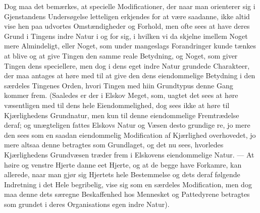 \documentclass[12pt]{book}
\def\textit#1{#1}%
\def\emph#1{#1}%
\newcommand{\opage}[1]{\marginnote{\footnotesize\textit{[#1]}}}
\begin{document}
Dog maa det bemærkes, at specielle Modificationer, der naar man orienterer sig i
Gjenstandens Undersøgelse letteligen erkjendes for at være saadanne, ikke altid vise hen
paa udvortes Omstændigheder og Forhold, men ofte sees at have deres Grund i Tingens indre
Natur i og for sig, i hvilken vi da skjelne imellem Noget mere Almindeligt, eller
\emph{Noget}, som under mangeslags Forandringer kunde tænkes at blive og at give Tingen
den samme reale Betydning, og \emph{Noget}, som giver Tingen dens speciellere, men dog i
dens eget indre Natur grundede Charakteer, der maa antages at høre med til at give den
dens eiendommelige Betydning i den særdeles Tingenes Orden, hvori Tingen med hiin
Grundtypus denne Gang kommer frem. (Saaledes er der i Elskov Meget, som, uagtet det sees
at høre væsentligen med til dens hele Eiendommelighed, dog sees ikke at høre til
Kjærlighedens Grundnatur, men kun til denne eiendommelige Fremtrædelse deraf; og
unægteligen fattes Elskovs Natur og Væsen desto grundige%
\opage{126}re, jo mere den sees som en saadan eiendommelig Modification af Kjærlighed overhovedet,
jo mere altsaa denne betragtes som Grundlaget, og det nu sees, hvorledes Kjærlighedens
Grundvæsen træder frem i Elskovens eiendommelige Natur. --- At høire og venstre Hjerte
danne eet Hjerte, og at de begge have Forkamre, kan allerede, naar man gjør sig Hjertets
hele Bestemmelse og dets deraf følgende Indretning i det Hele begribelig, vise sig som en
særdeles Modification, men dog maa denne dets særegne Beskaffenhed hos Mennesket og
Pattedyrene betragtes som grundet i deres Organisations egen \emph{indre Natur}).
\end{document}
